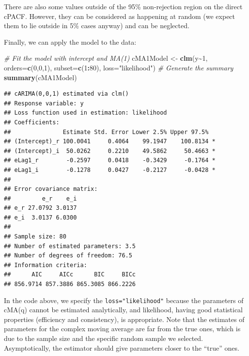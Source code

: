 \documentclass[
]{book}
\newenvironment{Shaded}{\begin{snugshade}}{\end{snugshade}}
\newcommand{\CommentTok}[1]{\textcolor[rgb]{0.56,0.35,0.01}{\textit{#1}}}
\newcommand{\DataTypeTok}[1]{\textcolor[rgb]{0.13,0.29,0.53}{#1}}
\newcommand{\DecValTok}[1]{\textcolor[rgb]{0.00,0.00,0.81}{#1}}
\newcommand{\KeywordTok}[1]{\textcolor[rgb]{0.13,0.29,0.53}{\textbf{#1}}}
\newcommand{\NormalTok}[1]{#1}
\newcommand{\OperatorTok}[1]{\textcolor[rgb]{0.81,0.36,0.00}{\textbf{#1}}}
\newcommand{\StringTok}[1]{\textcolor[rgb]{0.31,0.60,0.02}{#1}}
\begin{document}
There are also some values outside of the 95\% non-rejection region on the direct cPACF. However, they can be considered as happening at random (we expect them to lie outside in 5\% cases anyway) and can be neglected.

Finally, we can apply the model to the data:

\begin{Shaded}
\begin{Highlighting}[]
\CommentTok{\# Fit the model with intercept and MA(1)}
\NormalTok{cMA1Model \textless{}{-}}\StringTok{ }\KeywordTok{clm}\NormalTok{(y}\OperatorTok{\textasciitilde{}}\DecValTok{1}\NormalTok{, }\DataTypeTok{orders=}\KeywordTok{c}\NormalTok{(}\DecValTok{0}\NormalTok{,}\DecValTok{0}\NormalTok{,}\DecValTok{1}\NormalTok{),}
                 \DataTypeTok{subset=}\KeywordTok{c}\NormalTok{(}\DecValTok{1}\OperatorTok{:}\DecValTok{80}\NormalTok{), }\DataTypeTok{loss=}\StringTok{"likelihood"}\NormalTok{)}
\CommentTok{\# Generate the summary}
\KeywordTok{summary}\NormalTok{(cMA1Model)}
\end{Highlighting}
\end{Shaded}

\begin{verbatim}
## cARIMA(0,0,1) estimated via clm()
## Response variable: y
## Loss function used in estimation: likelihood
## Coefficients:
##               Estimate Std. Error Lower 2.5% Upper 97.5%  
## (Intercept)_r 100.0041     0.4064    99.1947    100.8134 *
## (Intercept)_i  50.0262     0.2210    49.5862     50.4663 *
## eLag1_r        -0.2597     0.0418    -0.3429     -0.1764 *
## eLag1_i        -0.1278     0.0427    -0.2127     -0.0428 *
## 
## Error covariance matrix:
##         e_r    e_i
## e_r 27.0792 3.0137
## e_i  3.0137 6.0300
## 
## Sample size: 80
## Number of estimated parameters: 3.5
## Number of degrees of freedom: 76.5
## Information criteria:
##      AIC     AICc      BIC     BICc 
## 856.9714 857.3886 865.3085 866.2226
\end{verbatim}

In the code above, we specify the \texttt{loss="likelihood"} because the parameters of cMA(q) cannot be estimated analytically, and likelihood, having good statistical properties (efficiency and consistency), is appropriate. Note that the estimates of parameters for the complex moving average are far from the true ones, which is due to the sample size and the specific random sample we selected. Asymptotically, the estimator should give parameters closer to the ``true'' ones.
\end{document}
